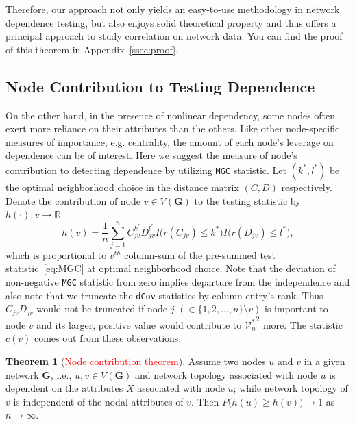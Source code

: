 \documentclass[11pt]{article}
\theoremstyle{definition}
\newtheorem{theorem}{Theorem}[section]
\begin{document}
Therefore, our approach not only yields an easy-to-use methodology in network dependence testing, but also enjoys solid theoretical property and thus offers a principal approach to study correlation on network data. You can find the proof of this theorem in Appendix~\ref{ssec:proof}.


\subsection{Node Contribution to Testing Dependence}

On the other hand, in the presence of nonlinear dependency, some nodes often exert more reliance on their attributes than the others. Like other node-specific measures of importance, e.g. centrality,  the amount of each node's leverage on dependence can be of interest. Here we suggest the measure of node's contribution to detecting dependence by utilizing \texttt{MGC} statistic. Let $(k^{*}, l^{*})$ be the optimal neighborhood choice in the distance matrix $(C, D)$ respectively. Denote the contribution of node $v \in V(\mathbf{G})$ to the testing statistic by  $h(\cdot) : v \rightarrow \mathbb{R}$
\begin{equation}
\label{eq:contribution}
h(v) =  \frac{1}{n} \sum\limits_{j=1}^{n} C^{k^{*}}_{j v} D^{l^{*}}_{j v} I \big(  r (C_{j v}) \leq k^{*}  \big) I \big( r (D_{ j v }) \leq l^{*} \big), 
\end{equation}
which is proportional to $v^{th}$ column-sum of the pre-summed test statistic~\ref{eq:MGC} at optimal neighborhood choice. Note that the deviation of non-negative \texttt{MGC} statistic from zero implies departure from the independence and also note that we truncate the \texttt{dCov} statistics by column entry's rank. Thus $C_{jv} D_{jv}$ would not be truncated if node $j$ $(\in \{ 1,2, \ldots, n \} \setminus v )$ is important to node $v$ and its larger, positive value would contribute to ${\mathcal{V}^{*}_{n}}^2$ more. The statistic $c(v)$ comes out from these observations. 

\begin{theorem}[\textcolor{red}{Node contribution theorem}]
	\label{contributiontheorem}
	Assume two nodes $u$ and $v$ in a given network $\mathbf{G}$, i.e., $u, v \in V(\mathbf{G})$ and network topology associated with node $u$  is dependent on the attributes $X$ associated with node $u$; while network topology of $v$ is independent of the nodal attributes of $v$. Then $P\big(  h(u)  \geq h(v) \big) \longrightarrow 1$ as $n \rightarrow \infty$.
\end{theorem}	
\end{document}
